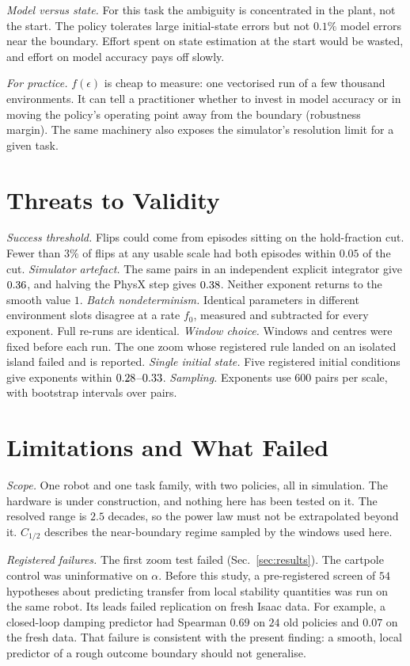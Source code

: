 \documentclass[conference]{IEEEtran}
\begin{document}
\emph{Model versus state.} For this task the ambiguity is concentrated in the plant, not the start. The
policy tolerates large initial-state errors but not $0.1\%$ model errors near the boundary. Effort spent on
state estimation at the start would be wasted, and effort on model accuracy pays off slowly.

\emph{For practice.} $f(\epsilon)$ is cheap to measure: one vectorised run of a few thousand
environments. It can tell a practitioner whether to invest in model accuracy or in moving the policy's
operating point away from the boundary (robustness margin). The same machinery also exposes the
simulator's resolution limit for a given task.

\section{Threats to Validity}
\emph{Success threshold.} Flips could come from episodes sitting on the hold-fraction cut. Fewer than $3\%$ of
flips at any usable scale had both episodes within $0.05$ of the cut.
\emph{Simulator artefact.} The same pairs in an independent explicit integrator give $0.36$, and halving
the PhysX step gives $0.38$. Neither exponent returns to the smooth value $1$.
\emph{Batch nondeterminism.} Identical parameters in different environment slots disagree at a rate $f_0$,
measured and subtracted for every exponent. Full re-runs are identical.
\emph{Window choice.} Windows and centres were fixed before each run. The one zoom whose registered rule landed
on an isolated island failed and is reported.
\emph{Single initial state.} Five registered initial conditions give exponents within $0.28$--$0.33$.
\emph{Sampling.} Exponents use $600$ pairs per scale, with bootstrap intervals over pairs.

\section{Limitations and What Failed}
\emph{Scope.} One robot and one task family, with two policies, all in simulation. The hardware is under
construction, and nothing here has been tested on it. The resolved range is $2.5$ decades, so the power
law must not be extrapolated beyond it. $C_{1/2}$ describes the near-boundary regime sampled by the
windows used here.

\emph{Registered failures.} The first zoom test failed (Sec.~\ref{sec:results}). The cartpole control was
uninformative on $\alpha$. Before this study, a pre-registered screen of $54$ hypotheses about predicting
transfer from local stability quantities was run on the same robot. Its leads failed replication on fresh
Isaac data. For example, a closed-loop damping predictor had Spearman $0.69$ on $24$ old policies and $0.07$
on the fresh data. That failure is consistent with the present finding: a smooth, local predictor of a
rough outcome boundary should not generalise.
\end{document}
